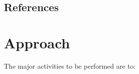 \documentclass[DM,lsstdraft,STS,toc]{lsstdoc}
\begin{document}
\subsection{References\label{sect:references}}
\renewcommand{\refname}{}


%


\section{Approach}
\label{sec:approach}

The major activities to be performed are to:
\end{document}
